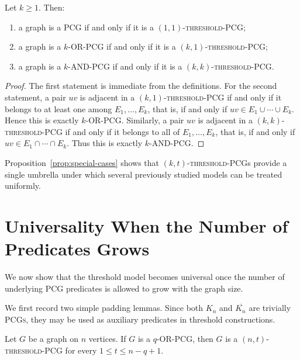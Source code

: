 \documentclass[a4paper,UKenglish,cleveref,autoref,thm-restate]{socg-lipics-v2021}
\begin{document}
\begin{proposition}\label{prop:special-cases}
Let $k\ge 1$. Then:
\begin{enumerate}
    \item a graph is a \textsc{PCG} if and only if it is a \textsc{$(1,1)$-threshold-\textsc{PCG}};
    \item a graph is a \textsc{$k$-\textsc{OR}-\textsc{PCG}} if and only if it is a \textsc{$(k,1)$-threshold-\textsc{PCG}};
    \item a graph is a \textsc{$k$-\textsc{AND}-\textsc{PCG}} if and only if it is a \textsc{$(k,k)$-threshold-\textsc{PCG}}.
\end{enumerate}
\end{proposition}

\begin{proof}
The first statement is immediate from the definitions. For the second statement, a pair $uv$ is adjacent in a \textsc{$(k,1)$-threshold-\textsc{PCG}} if and only if it belongs to at least one among $E_1,\dots,E_k$, that is, if and only if
\(
uv\in E_1\cup\cdots\cup E_k.
\)
Hence this is exactly \textsc{$k$-\textsc{OR}-\textsc{PCG}}. Similarly, a pair $uv$ is adjacent in a \textsc{$(k,k)$-threshold-\textsc{PCG}} if and only if it belongs to all of $E_1,\dots,E_k$, that is, if and only if
\(
uv\in E_1\cap\cdots\cap E_k.
\)
Thus this is exactly \textsc{$k$-\textsc{AND}-\textsc{PCG}}.
\end{proof}

Proposition~\ref{prop:special-cases} shows that \textsc{$(k,t)$-threshold-\textsc{PCG}}s provide a single umbrella under which several previously studied models can be treated uniformly.

\section{Universality When the Number of Predicates Grows}\label{sec:universality}

We now show that the threshold model becomes universal once the number of underlying \textsc{PCG} predicates is allowed to grow with the graph size.

We first record two simple padding lemmas. Since both $K_n$ and $\overline{K_n}$ are trivially \textsc{PCGs}, they may be used as auxiliary predicates in threshold constructions.

\begin{lemma}\label{lem:or-to-threshold}
Let $G$ be a graph on $n$ vertices. If $G$ is a \textsc{$q$-\textsc{OR}-\textsc{PCG}}, then $G$ is a \textsc{$(n,t)$-threshold-\textsc{PCG}} for every
\(
1 \le t \le n-q+1.
\)
\end{lemma}
\end{document}
